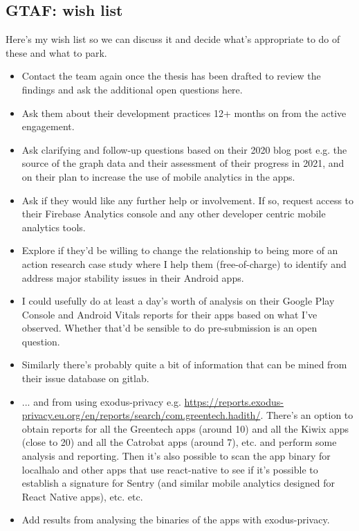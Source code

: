 \subsection*{GTAF: wish list}
Here's my wish list so we can discuss it and decide what's appropriate to do of these and what to park.
{\small
\begin{itemize}
    \itemsep0em
    \item Contact the team again once the thesis has been drafted to review the findings and ask the additional open questions here. 
    \item Ask them about their development practices 12+ months on from the active engagement.
    \item Ask clarifying and follow-up questions based on their 2020 blog post e.g. the source of the graph data and their assessment of their progress in 2021, and on their plan to increase the use of mobile analytics in the apps.
    \item Ask if they would like any further help or involvement. If so, request access to their Firebase Analytics console and any other developer centric mobile analytics tools.
    \item Explore if they'd be willing to change the relationship to being more of an action research case study where I help them (free-of-charge) to identify and address major stability issues in their Android apps.
\end{itemize}

\begin{itemize}
    \itemsep0em
    \item I could usefully do at least a day's worth of analysis on their Google Play Console and Android Vitals reports for their apps based on what I've observed. Whether that'd be sensible to do pre-submission is an open question.
    \item Similarly there's probably quite a bit of information that can be mined from their issue database on gitlab.
    \item ... and from using exodus-privacy e.g. \url{https://reports.exodus-privacy.eu.org/en/reports/search/com.greentech.hadith/}. There's an option to obtain reports for all the Greentech apps (around 10) and all the Kiwix apps (close to 20) and all the Catrobat apps (around 7), etc. and perform some analysis and reporting. Then it's also possible to scan the app binary for localhalo and other apps that use react-native to see if it's possible to establish a signature for Sentry (and similar mobile analytics designed for React Native apps), etc. etc. 
    \item Add results from analysing the binaries of the apps with exodus-privacy.
\end{itemize}
}  %


